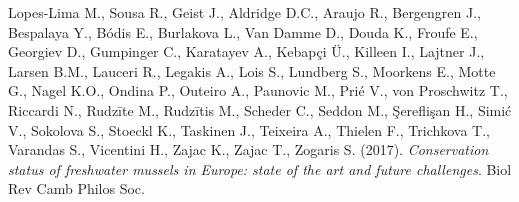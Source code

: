 \documentclass{article} %
\begin{document}
\begin{spacing}{1.2}
\begin{thebibliography}{9}
    Lopes-Lima M., Sousa R., Geist J., Aldridge D.C., Araujo R., Bergengren J., Bespalaya Y., Bódis E., Burlakova L., Van Damme D., Douda K., Froufe E., Georgiev D., Gumpinger C., Karatayev A., Kebapçi Ü., Killeen I., Lajtner J., Larsen B.M., Lauceri R., Legakis A., Lois S., Lundberg S., Moorkens E., Motte G., Nagel K.O., Ondina P., Outeiro A., Paunovic M., Prié V., von Proschwitz T., Riccardi N., Rudzīte M., Rudzītis M., Scheder C., Seddon M., Şereflişan H., Simić V., Sokolova S., Stoeckl K., Taskinen J., Teixeira A., Thielen F., Trichkova T., Varandas S., Vicentini H., Zajac K., Zajac T., Zogaris S. (2017). \textit{Conservation status of freshwater mussels in Europe: state of the art and future challenges}. Biol Rev Camb Philos Soc.

    \end{thebibliography}
\end{spacing}
\end{document}
